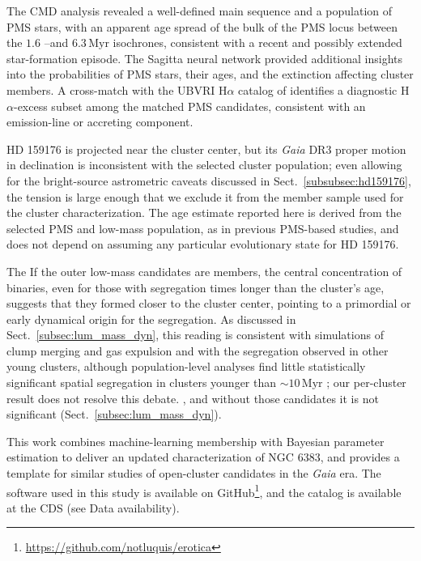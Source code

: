 \documentclass{aa}
\providecommand{\DIFaddtex}[1]{{\protect\color[rgb]{0,0,0.7}#1}} %
\providecommand{\DIFdeltex}[1]{{\protect\color[rgb]{0.65,0,0}\footnotesize #1}} %
\providecommand{\DIFaddbegin}{} %
\providecommand{\DIFaddend}{} %
\providecommand{\DIFdelbegin}{} %
\providecommand{\DIFdelend}{} %
\providecommand{\DIFadd}[1]{\texorpdfstring{\DIFaddtex{#1}}{#1}} %
\providecommand{\DIFdel}[1]{\texorpdfstring{\DIFdeltex{#1}}{}} %
\providecommand{\DIFscaledelfig}{0.5}
\newlength{\DIFdelgraphicswidth} %
\newlength{\DIFdelgraphicsheight} %
\providecommand{\DIFaddincludegraphics}[2][]{{\color{blue}\fbox{\DIFOincludegraphics[#1]{#2}}}} %
\providecommand{\DIFdelincludegraphics}[2][]{%
\sbox{\DIFdelgraphicsbox}{\DIFOincludegraphics[#1]{#2}}%
\settoboxwidth{\DIFdelgraphicswidth}{\DIFdelgraphicsbox} %
\settoboxtotalheight{\DIFdelgraphicsheight}{\DIFdelgraphicsbox} %
\scalebox{\DIFscaledelfig}{%
\parbox[b]{\DIFdelgraphicswidth}{\usebox{\DIFdelgraphicsbox}\\[-\baselineskip] \rule{\DIFdelgraphicswidth}{0em}}\llap{\resizebox{\DIFdelgraphicswidth}{\DIFdelgraphicsheight}{%
\setlength{\unitlength}{\DIFdelgraphicswidth}%
\begin{picture}(1,1)%
\thicklines\linethickness{2pt} %
{\color[rgb]{1,0,0}\put(0,0){\framebox(1,1){}}}%
{\color[rgb]{1,0,0}\put(0,0){\line( 1,1){1}}}%
{\color[rgb]{1,0,0}\put(0,1){\line(1,-1){1}}}%
\end{picture}%
}\hspace*{3pt}}} %
} %
\DeclareRobustCommand{\DIFaddbegin}{\DIFOaddbegin \let\includegraphics\DIFaddincludegraphics} %
\DeclareRobustCommand{\DIFaddend}{\DIFOaddend \let\includegraphics\DIFOincludegraphics} %
\DeclareRobustCommand{\DIFdelbegin}{\DIFOdelbegin \let\includegraphics\DIFdelincludegraphics} %
\DeclareRobustCommand{\DIFdelend}{\DIFOaddend \let\includegraphics\DIFOincludegraphics} %
\begin{document}
The CMD analysis revealed a well-defined main sequence and a population of PMS stars, with \DIFdelbegin \DIFdel{an apparent age spread of }\DIFdelend \DIFaddbegin \DIFadd{the bulk of the PMS locus between the }\DIFaddend $1.6$ \DIFdelbegin \DIFdel{--}\DIFdelend \DIFaddbegin \DIFadd{and }\DIFaddend $6.3\,\mathrm{Myr}$ \DIFaddbegin \DIFadd{isochrones}\DIFaddend , consistent with a recent and possibly extended star-formation episode. The Sagitta neural network provided additional insights into the probabilities of PMS stars, their ages, and the extinction affecting cluster members. A cross-match with the UBVRI H$\alpha$ catalog of \citet{2010AA...511A..25R} identifies a diagnostic H$\alpha$-excess subset among the matched PMS candidates, consistent with an emission-line or accreting component.

HD 159176 is projected near the cluster center, but its \textit{Gaia} DR3 proper motion in declination is inconsistent with the selected cluster population; even allowing for the bright-source astrometric caveats discussed in Sect.~\ref{subsubsec:hd159176}, the tension is large enough that we exclude it from the member sample used for the cluster characterization. The age estimate reported here is derived from the selected PMS and low-mass population, as in previous PMS-based studies, and does not depend on assuming any particular evolutionary state for HD 159176.

\DIFdelbegin \DIFdel{The }\DIFdelend \DIFaddbegin \DIFadd{If the outer low-mass candidates are members, the }\DIFaddend central concentration of binaries, even for those with segregation times longer than the cluster's age, suggests that they formed closer to the cluster center, pointing to a primordial or early dynamical origin for the segregation. As discussed in Sect.~\ref{subsec:lum_mass_dyn}, this reading is consistent with simulations of clump merging and gas expulsion and with the segregation observed in other young clusters, although population-level analyses find little statistically significant spatial segregation in clusters younger than $\sim10\,\mathrm{Myr}$ \citep{2026AJ....171..236Z}; our per-cluster result does not resolve this debate\DIFdelbegin \DIFdel{.
}\DIFdelend \DIFaddbegin \DIFadd{, and without those candidates it is not significant (Sect.~\ref{subsec:lum_mass_dyn}).
}\DIFaddend 

This work combines machine-learning membership with Bayesian parameter estimation to deliver an updated characterization of NGC 6383, and provides a template for similar studies of open-cluster candidates in the \textit{Gaia} era. The software used in this study is available on GitHub\footnote{\href{https://github.com/notluquis/erotica}{https://github.com/notluquis/erotica}}, and the catalog is available at the CDS (see Data availability).
\end{document}
